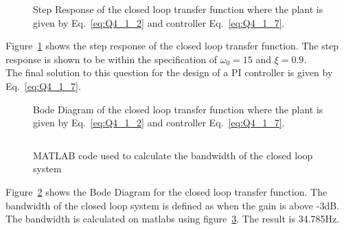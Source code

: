 \begin{figure}[ht!]
    \centering
    
    \caption{Step Response of the closed loop transfer function where the plant is given by Eq.~\eqref{eq:Q4_1_2} and controller Eq.~\eqref{eq:Q4_1_7}. \appendixamble{\ex}}
    \label{fig:\ex_1}
\end{figure}\FloatBarrier

Figure~\ref{fig:\ex_1} shows the step response of the closed loop transfer function. The step response is shown to be within the specification of $\omega_0 = 15$ and $\xi = 0.9$.\\

The final solution to this question for the design of a PI controller is given by Eq.~\eqref{eq:Q4_1_7}.

\begin{figure}[ht!]
    \centering
    
    
    \caption{Bode Diagram of the closed loop transfer function where the plant is given by Eq.~\eqref{eq:Q4_1_2} and controller Eq.~\eqref{eq:Q4_1_7}. \appendixamble{\ex}}
    \label{fig:\ex_2}
\end{figure}\FloatBarrier

\begin{figure}[ht!]
    \centering
    \inputminted[firstline=58,lastline=58]{matlab}{matlab/Q4_1.m}
    \caption{MATLAB code used to calculate the bandwidth of the closed loop system}\label{fig:Q4code1}
\end{figure}\FloatBarrier

Figure~\ref{fig:\ex_2} shows the Bode Diagram for the closed loop transfer function. The bandwidth of the closed loop system is defined as when the gain is above -3dB. The bandwidth is calculated on matlabs using figure~\ref{fig:Q4code1}. The result is 34.785Hz.